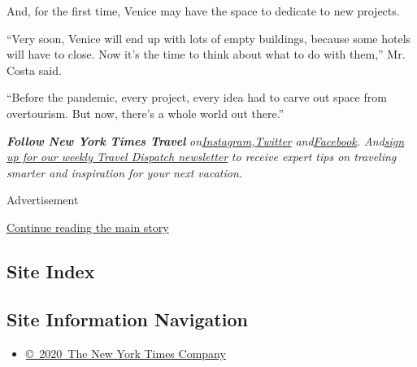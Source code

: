 And, for the first time, Venice may have the space to dedicate to new
projects.

``Very soon, Venice will end up with lots of empty buildings, because
some hotels will have to close. Now it's the time to think about what to
do with them,'' Mr. Costa said.

``Before the pandemic, every project, every idea had to carve out space
from overtourism. But now, there's a whole world out there.''

\emph{\textbf{Follow New York Times Travel}}
\emph{on}\href{https://www.instagram.com/nytimestravel/}{\emph{Instagram}}\emph{,}\href{https://twitter.com/nytimestravel}{\emph{Twitter}}
\emph{and}\href{https://www.facebookcorewwwi.onion/nytimestravel/}{\emph{Facebook}}\emph{.
And}\href{https://www.nytimes3xbfgragh.onion/newsletters/traveldispatch}{\emph{sign
up for our weekly Travel Dispatch newsletter}} \emph{to receive expert
tips on traveling smarter and inspiration for your next vacation.}

Advertisement

\protect\hyperlink{after-bottom}{Continue reading the main story}

\hypertarget{site-index}{%
\subsection{Site Index}\label{site-index}}

\hypertarget{site-information-navigation}{%
\subsection{Site Information
Navigation}\label{site-information-navigation}}

\begin{itemize}
\tightlist
\item
  \href{https://help.nytimes3xbfgragh.onion/hc/en-us/articles/115014792127-Copyright-notice}{©~2020~The
  New York Times Company}
\end{itemize}

